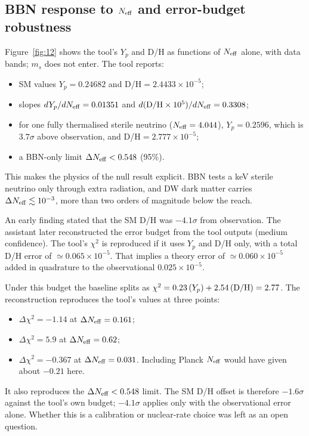 \documentclass[11pt,a4paper]{article}
\begin{document}
\subsection{BBN response to $N_{\rm eff}$ and error-budget robustness}






Figure~\ref{fig:12} shows the tool's $Y_p$ and D/H as functions of $N_{\rm eff}$ alone, with data bands; $m_s$ does not enter. The tool reports:
\begin{itemize}
\item SM values $Y_p=0.24682$ and D/H$=2.4433\times10^{-5}$;
\item slopes $dY_p/dN_{\rm eff}=0.01351$ and $d({\rm D/H}\times10^5)/dN_{\rm eff}=0.3308$;
\item for one fully thermalised sterile neutrino ($N_{\rm eff}=4.044$), $Y_p=0.2596$, which is $3.7\sigma$ above observation, and D/H$=2.777\times10^{-5}$;
\item a BBN-only limit $\Delta N_{\rm eff}<0.548$ (95\%).
\end{itemize}
This makes the physics of the null result explicit. BBN tests a keV sterile neutrino only through extra radiation, and DW dark matter carries $\Delta N_{\rm eff}\lesssim10^{-3}$, more than two orders of magnitude below the reach.

An early finding stated that the SM D/H was $-4.1\sigma$ from observation. The assistant later reconstructed the error budget from the tool outputs (medium confidence). The tool's $\chi^2$ is reproduced if it uses $Y_p$ and D/H only, with a total D/H error of $\simeq0.065\times10^{-5}$. That implies a theory error of $\simeq0.060\times10^{-5}$ added in quadrature to the observational $0.025\times10^{-5}$.

Under this budget the baseline splits as $\chi^2=0.23\,(Y_p)+2.54\,({\rm D/H})=2.77$. The reconstruction reproduces the tool's values at three points:
\begin{itemize}
\item $\Delta\chi^2=-1.14$ at $\Delta N_{\rm eff}=0.161$;
\item $\Delta\chi^2=5.9$ at $\Delta N_{\rm eff}=0.62$;
\item $\Delta\chi^2=-0.367$ at $\Delta N_{\rm eff}=0.031$. Including Planck $N_{\rm eff}$ would have given about $-0.21$ here.
\end{itemize}
It also reproduces the $\Delta N_{\rm eff}<0.548$ limit. The SM D/H offset is therefore $-1.6\sigma$ against the tool's own budget; $-4.1\sigma$ applies only with the observational error alone. Whether this is a calibration or nuclear-rate choice was left as an open question.
\end{document}
